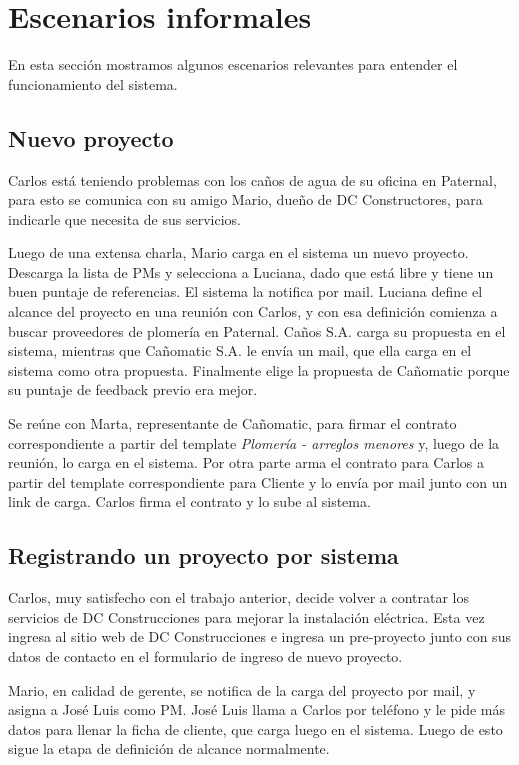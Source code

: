 \section{Escenarios informales}

En esta sección mostramos algunos escenarios relevantes para entender el funcionamiento del sistema.

\subsection{Nuevo proyecto} 
Carlos está teniendo problemas con los caños de agua de su oficina en Paternal, para esto se comunica con su amigo Mario, dueño de DC Constructores, para indicarle que necesita de sus servicios.

Luego de una extensa charla, Mario carga en el sistema un nuevo proyecto. Descarga la lista de PMs y selecciona a Luciana, dado que está libre y tiene un buen puntaje de referencias. El sistema la notifica por mail.
Luciana define el alcance del proyecto en una reunión con Carlos, y con esa definición comienza a buscar proveedores de plomería en Paternal. 
Caños S.A. carga su propuesta en el sistema, mientras que Cañomatic S.A. le envía un mail, que ella carga en el sistema como otra propuesta. Finalmente elige la propuesta de Cañomatic porque su puntaje de feedback previo era mejor.

Se reúne con Marta, representante de Cañomatic, para firmar el contrato correspondiente a partir del template \textit{Plomería - arreglos menores} y, luego de la reunión, lo carga en el sistema. Por otra parte arma el contrato para Carlos a partir del template correspondiente para Cliente y lo envía por mail junto con un link de carga. Carlos firma el contrato y lo sube al sistema.


\subsection{Registrando un proyecto por sistema} 
Carlos, muy satisfecho con el trabajo anterior, decide volver a contratar los servicios de DC Construcciones para mejorar la instalación eléctrica. Esta vez ingresa al sitio web de DC Construcciones e ingresa un pre-proyecto junto con sus datos de contacto en el formulario de ingreso de nuevo proyecto.

Mario, en calidad de gerente, se notifica de la carga del proyecto por mail, y asigna a José Luis como PM. José Luis llama a Carlos por teléfono y le pide más datos para llenar la ficha de cliente, que carga luego en el sistema. Luego de esto sigue la etapa de definición de alcance normalmente.

